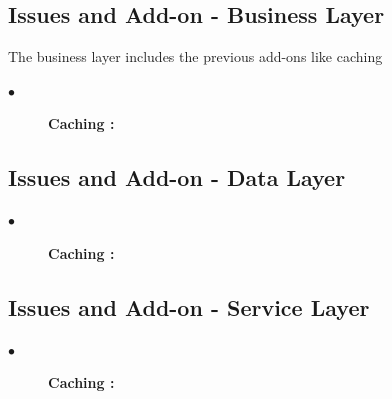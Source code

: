 \subsection{Issues and Add-on - Business Layer}	
  		The business layer includes the previous add-ons like caching 
\begin{description}
  \item[$\bullet$]{\bfseries Caching :} 
\end{description}  

\subsection{Issues and Add-on - Data Layer}	

\begin{description}
  \item[$\bullet$]{\bfseries Caching :} 
\end{description}  

\subsection{Issues and Add-on - Service Layer}	

\begin{description}
  \item[$\bullet$]{\bfseries Caching :} 
\end{description}  